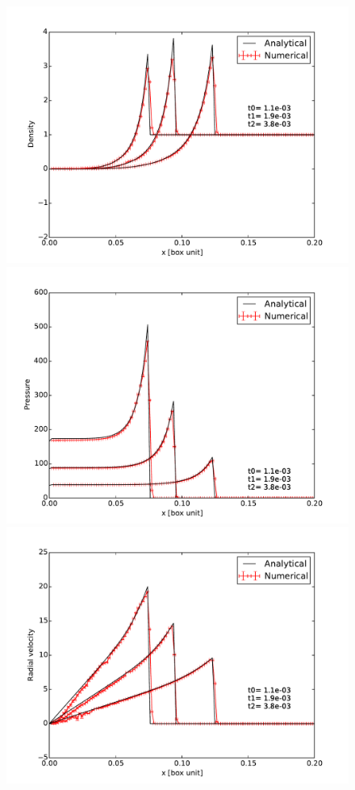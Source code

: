 \begin{figure}[bth]
   \begin{minipage}[c]{.46\linewidth}
        \includegraphics[width=\textwidth]{img/03/sedov/sedov_evol_8_den_lin.pdf} 
		\includegraphics[width=\textwidth]{img/03/sedov/sedov_evol_8_pres.pdf} 
		\includegraphics[width=\textwidth]{img/03/sedov/sedov_evol_8_vel.pdf} 


\end{minipage}
\end{figure}
